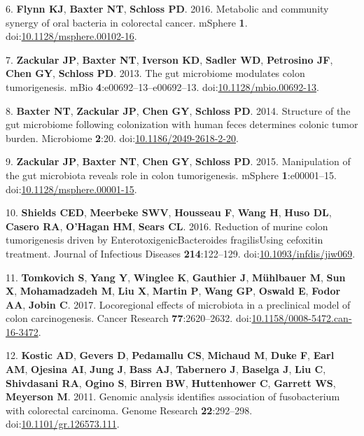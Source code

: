 \documentclass[11pt,]{article}
\begin{document}
\leavevmode\hypertarget{ref-Flynn2016}{}%
6. \textbf{Flynn KJ}, \textbf{Baxter NT}, \textbf{Schloss PD}. 2016.
Metabolic and community synergy of oral bacteria in colorectal cancer.
mSphere \textbf{1}.
doi:\href{https://doi.org/10.1128/msphere.00102-16}{10.1128/msphere.00102-16}.

\leavevmode\hypertarget{ref-Zackular2013}{}%
7. \textbf{Zackular JP}, \textbf{Baxter NT}, \textbf{Iverson KD},
\textbf{Sadler WD}, \textbf{Petrosino JF}, \textbf{Chen GY},
\textbf{Schloss PD}. 2013. The gut microbiome modulates colon
tumorigenesis. mBio \textbf{4}:e00692--13--e00692--13.
doi:\href{https://doi.org/10.1128/mbio.00692-13}{10.1128/mbio.00692-13}.

\leavevmode\hypertarget{ref-Baxter2014}{}%
8. \textbf{Baxter NT}, \textbf{Zackular JP}, \textbf{Chen GY},
\textbf{Schloss PD}. 2014. Structure of the gut microbiome following
colonization with human feces determines colonic tumor burden.
Microbiome \textbf{2}:20.
doi:\href{https://doi.org/10.1186/2049-2618-2-20}{10.1186/2049-2618-2-20}.

\leavevmode\hypertarget{ref-Zackular2015}{}%
9. \textbf{Zackular JP}, \textbf{Baxter NT}, \textbf{Chen GY},
\textbf{Schloss PD}. 2015. Manipulation of the gut microbiota reveals
role in colon tumorigenesis. mSphere \textbf{1}:e00001--15.
doi:\href{https://doi.org/10.1128/msphere.00001-15}{10.1128/msphere.00001-15}.

\leavevmode\hypertarget{ref-DeStefanoShields2016}{}%
10. \textbf{Shields CED}, \textbf{Meerbeke SWV}, \textbf{Housseau F},
\textbf{Wang H}, \textbf{Huso DL}, \textbf{Casero RA}, \textbf{O'Hagan
HM}, \textbf{Sears CL}. 2016. Reduction of murine colon tumorigenesis
driven by EnterotoxigenicBacteroides fragilisUsing cefoxitin treatment.
Journal of Infectious Diseases \textbf{214}:122--129.
doi:\href{https://doi.org/10.1093/infdis/jiw069}{10.1093/infdis/jiw069}.

\leavevmode\hypertarget{ref-Tomkovich2017}{}%
11. \textbf{Tomkovich S}, \textbf{Yang Y}, \textbf{Winglee K},
\textbf{Gauthier J}, \textbf{Mühlbauer M}, \textbf{Sun X},
\textbf{Mohamadzadeh M}, \textbf{Liu X}, \textbf{Martin P}, \textbf{Wang
GP}, \textbf{Oswald E}, \textbf{Fodor AA}, \textbf{Jobin C}. 2017.
Locoregional effects of microbiota in a preclinical model of colon
carcinogenesis. Cancer Research \textbf{77}:2620--2632.
doi:\href{https://doi.org/10.1158/0008-5472.can-16-3472}{10.1158/0008-5472.can-16-3472}.

\leavevmode\hypertarget{ref-Kostic2011}{}%
12. \textbf{Kostic AD}, \textbf{Gevers D}, \textbf{Pedamallu CS},
\textbf{Michaud M}, \textbf{Duke F}, \textbf{Earl AM}, \textbf{Ojesina
AI}, \textbf{Jung J}, \textbf{Bass AJ}, \textbf{Tabernero J},
\textbf{Baselga J}, \textbf{Liu C}, \textbf{Shivdasani RA},
\textbf{Ogino S}, \textbf{Birren BW}, \textbf{Huttenhower C},
\textbf{Garrett WS}, \textbf{Meyerson M}. 2011. Genomic analysis
identifies association of fusobacterium with colorectal carcinoma.
Genome Research \textbf{22}:292--298.
doi:\href{https://doi.org/10.1101/gr.126573.111}{10.1101/gr.126573.111}.
\end{document}
